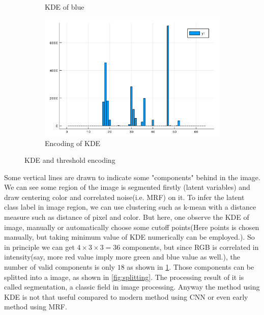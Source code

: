 \documentclass{article}
\begin{document}
\begin{figure}[htb]
\begin{subfigure}[b]{0.24\linewidth}
    \caption{KDE of blue}
  \end{subfigure}
  \begin{subfigure}[b]{0.24\linewidth}
    \includegraphics[width=\linewidth]{images/kde_code.png}
    \caption{Encoding of KDE}
  \end{subfigure}
  \caption{KDE and threshold encoding}
  \label{fig:kde}
\end{figure}

Some vertical lines are drawn to indicate some "components" behind in the image. We can see some region of the image is segmented firstly
(latent variables) and draw centering color and correlated noise(i.e. MRF) on it. To infer the latent class label in image region,
we can use clustering such as k-mean with a distance measure such as distance of pixel and color. But here, one observe the KDE of image,
manually or automatically choose some cutoff points(Here points is chosen manually, but taking minimum value of KDE numerically 
can be employed.). So in principle we can get $4\times 3\times 3=36$ components, but since RGB is correlated in intensity(say, more red
value imply more green and blue value as well.), the number of valid components is only $18$ as shown in \ref{fig:kde}.
Those components can be splitted into a image, as shown in \ref{fig:splitting}. The processing result of it is called segmentation,
a classic field in image processing. 
Anyway the method using KDE is not that useful compared to modern method using CNN \cite{long2015fully} or 
even early method using MRF\cite{panjwani1995markov}. 
\end{document}
